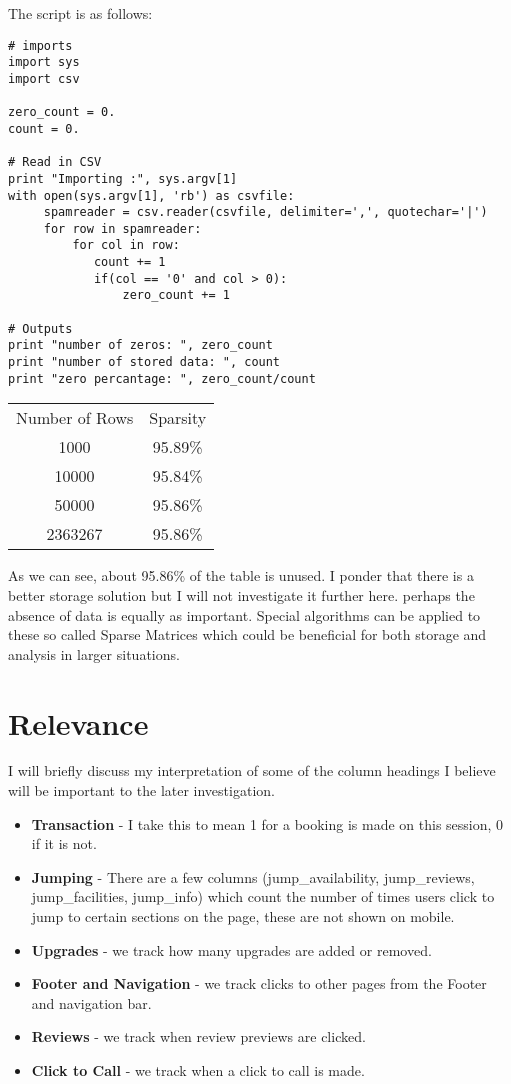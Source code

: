 \documentclass[a4paper]{report}
\begin{document}
The script is as follows:
\begin{lstlisting}
# imports
import sys
import csv

zero_count = 0.
count = 0.

# Read in CSV
print "Importing :", sys.argv[1]
with open(sys.argv[1], 'rb') as csvfile:
     spamreader = csv.reader(csvfile, delimiter=',', quotechar='|')
     for row in spamreader:
         for col in row:
            count += 1
            if(col == '0' and col > 0):
                zero_count += 1

# Outputs
print "number of zeros: ", zero_count
print "number of stored data: ", count
print "zero percantage: ", zero_count/count
\end{lstlisting}

\begin{center}
\begin{tabular}{ c c }
 Number of Rows & Sparsity  \\ 
 1000 & 95.89\% \\ 
 10000 & 95.84\% \\ 
 50000 & 95.86\% \\ 
 2363267 & 95.86\% \\ 
\end{tabular}
\end{center}

As we can see, about 95.86\% of the table  is unused. I ponder that there is a better storage solution but I will not investigate it further here. perhaps the absence of data is equally as important. Special algorithms can be applied to these so called Sparse Matrices which could be beneficial for both storage and analysis in larger situations.

\section{Relevance}
I will briefly discuss my interpretation of some of the column headings I believe will be important to the later investigation.

\begin{itemize}
\item \textbf{Transaction} - I take this to mean 1 for a booking is made on this session, 0 if it is not.
\item \textbf{Jumping} - There are a few columns (jump\_availability, jump\_reviews,  jump\_facilities, jump\_info) which count the number of times users click to jump to certain sections on the page, these are not shown on mobile.
\item \textbf{Upgrades} - we track how many upgrades are added or removed.
\item \textbf{Footer and Navigation} - we track clicks to other pages from the Footer and navigation bar.
\item \textbf{Reviews} - we track when review previews are clicked.
\item \textbf{Click to Call} - we track when a click to call is made.
\end{itemize}
\end{document}

